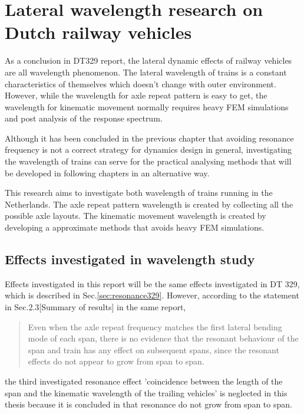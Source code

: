 

\chapter{Lateral wavelength research on Dutch railway vehicles}\label{sec:wavelengthstudy}

As a conclusion in DT329 report, the lateral dynamic effects of railway vehicles are all wavelength phenomenon. The lateral wavelength of trains is a constant characteristics of themselves which doesn't change with outer environment. However, while the wavelength for axle repeat pattern is easy to get, the wavelength for kinematic movement normally requires heavy FEM simulations and post analysis of the response spectrum. 

Although it has been concluded in the previous chapter that avoiding resonance frequency is not a correct strategy for dynamics design in general, investigating the wavelength of trains can serve for the practical analysing methods that will be developed in following chapters in an alternative way.

This research aims to investigate both wavelength of trains running in the Netherlands. The axle repeat pattern wavelength is created by collecting all the possible axle layouts. The kinematic movement wavelength is created by developing a approximate methods that avoids heavy FEM simulations. 


\section{Effects investigated in wavelength study}

Effects investigated in this report will be the same effects investigated in DT 329, which is described in Sec.\ref{sec:resonance329}. However, according to the statement in Sec.2.3[Summary of results] in the same report,

\begin{quote}
Even when the axle repeat frequency matches the first lateral bending mode of each span, there is no evidence that the resonant behaviour of the span and train has any effect on subsequent spans, since the resonant effects do not appear to grow from span to span.
\end{quote}

the third investigated resonance effect 'coincidence between the length of the span and the kinematic wavelength of the trailing vehicles' is neglected in this thesis because it is concluded in \citet{d181dt329} that resonance do not grow from span to span. 


